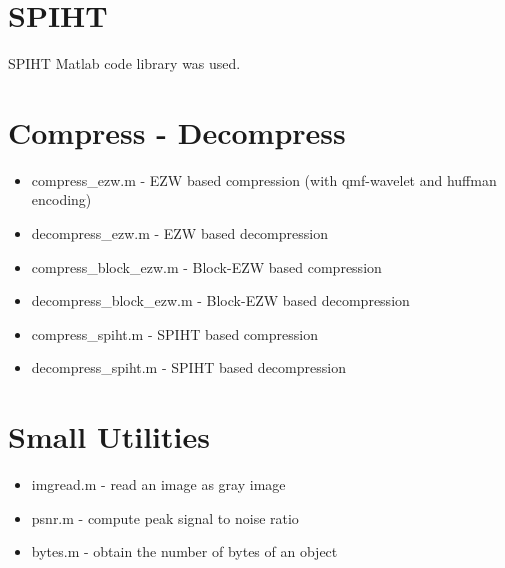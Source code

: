 \documentclass[article,oneside]{memoir}
\begin{document}
\section{SPIHT}

SPIHT Matlab code \cite{SPIHT} library was used. 

\section{Compress - Decompress}

\begin{itemize}
\item compress\_ezw.m - EZW based compression (with qmf-wavelet and huffman encoding)
\item decompress\_ezw.m - EZW based decompression
\item compress\_block\_ezw.m - Block-EZW based compression
\item decompress\_block\_ezw.m - Block-EZW based decompression
\item compress\_spiht.m - SPIHT based compression
\item decompress\_spiht.m - SPIHT based decompression
\end{itemize}

\section{Small Utilities}

\begin{itemize}
\item imgread.m - read an image as gray image
\item psnr.m - compute peak signal to noise ratio
\item bytes.m - obtain the number of bytes of an object
\end{itemize}
\end{document}

